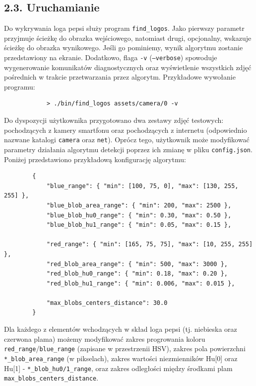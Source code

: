 \documentclass[11pt,a4paper,twoside]{report}
\begin{document}
	\subsection*{2.3. Uruchamianie}

		Do wykrywania loga pepsi służy program \texttt{find\_logos}. Jako pierwszy parametr przyjmuje ścieżkę do obrazka wejściowego, natomiast drugi, opcjonalny, wskazuje ścieżkę do obrazka wynikowego. Jeśli go pominiemy, wynik algorytmu zostanie przedstawiony na ekranie. Dodatkowo, flaga \texttt{-v} (\texttt{--verbose}) spowoduje wygenerowanie komunikatów diagnostycznych oraz wyświetlenie wszystkich zdjęć pośrednich w trakcie przetwarzania przez algorytm. Przykładowe wywołanie programu:

		\begin{verbatim}
			> ./bin/find_logos assets/camera/0 -v
		\end{verbatim}

		Do dyspozycji użytkownika przygotowano dwa zestawy zdjęć testowych: pochodzących z kamery smartfonu oraz pochodzących z internetu (odpowiednio nazwane katalogi \texttt{camera} oraz \texttt{net}). Oprócz tego, użytkownik może modyfikować parametry działania algorytmu detekcji poprzez ich zmianę w pliku \texttt{config.json}. Poniżej przedstawiono przykładową konfigurację algorytmu:

		\begin{verbatim}
		{
		    "blue_range": { "min": [100, 75, 0], "max": [130, 255, 255] },
		    "blue_blob_area_range": { "min": 200, "max": 2500 },
		    "blue_blob_hu0_range": { "min": 0.30, "max": 0.50 },
		    "blue_blob_hu1_range": { "min": 0.05, "max": 0.15 },

		    "red_range": { "min": [165, 75, 75], "max": [10, 255, 255] },
		    "red_blob_area_range": { "min": 500, "max": 3000 },
		    "red_blob_hu0_range": { "min": 0.18, "max": 0.20 },
		    "red_blob_hu1_range": { "min": 0.006, "max": 0.015 },

		    "max_blobs_centers_distance": 30.0
		}
		\end{verbatim}

		Dla każdego z elementów wchodzących w skład loga pepsi (tj. niebieska oraz czerwona plama) możemy modyfikować zakres progrowania koloru \texttt{red\_range}/\texttt{blue\_range} (zapisane w przestrzenii HSV), zakres pola powierzchni \texttt{*\_blob\_area\_range} (w pikselach), zakres wartości niezmienników Hu[0] oraz Hu[1] - \texttt{*\_blob\_hu0/1\_range}, oraz zakres odległości między środkami plam \texttt{max\_blobs\_centers\_distance}.
\end{document}
